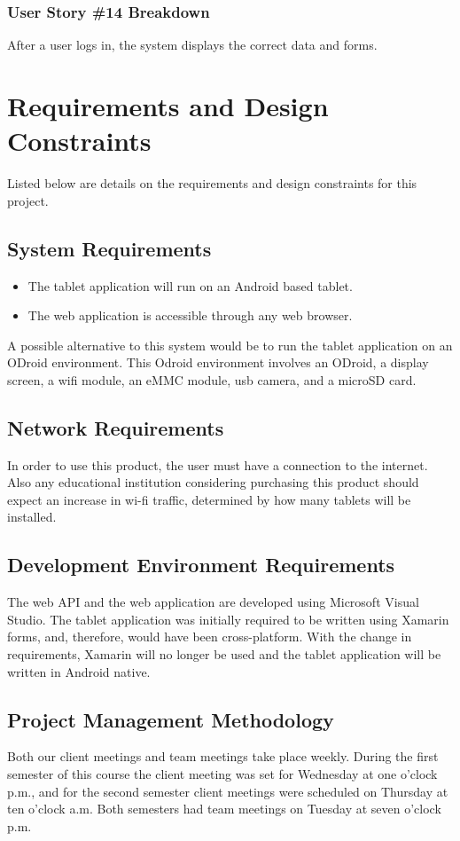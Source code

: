 \subsubsection{User Story \#14 Breakdown}
After a user logs in, the system displays the correct data and forms.

\section{Requirements and Design Constraints}
Listed below are details on the requirements and design constraints for this project.


\subsection{System  Requirements}
\begin{itemize}
\item The tablet application will run on an Android based tablet.
\item The web application is accessible through any web browser.
\end{itemize}

\noindent A possible alternative to this system would be to run the tablet application on an ODroid environment. This Odroid environment involves an ODroid, a display screen, a wifi module, an eMMC module, usb camera, and a microSD card.


\subsection{Network Requirements}
In order to use this product, the user must have a connection to the internet. Also any educational institution considering purchasing this product should expect an increase in wi-fi traffic, determined by how many tablets will be installed. 


\subsection{Development Environment Requirements}
The web API and the web application are developed using Microsoft Visual Studio. The tablet application was initially required to be written using Xamarin forms, and, therefore, would have been cross-platform. With the change in requirements, Xamarin will no longer be used and the tablet application will be written in Android native.  

\subsection{Project  Management Methodology}
Both our client meetings and team meetings take place weekly. During the first semester of this course the client meeting was set for Wednesday at one o'clock p.m., and for the second semester client meetings were scheduled on Thursday at ten o'clock a.m. Both semesters had team meetings on Tuesday at seven o'clock p.m.


